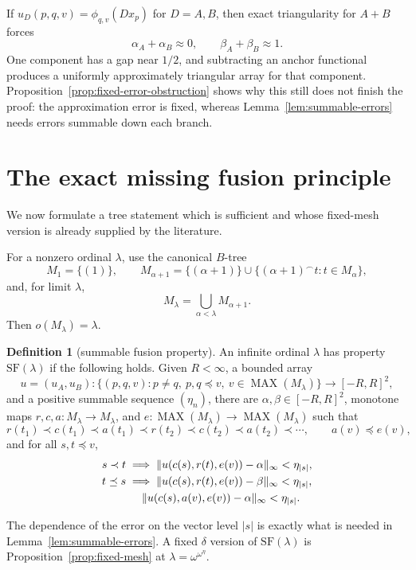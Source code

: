 \documentclass[11pt]{article}
\theoremstyle{definition}
\newtheorem{definition}[theorem]{Definition}
\theoremstyle{remark}
\newcommand{\MAX}{\operatorname{MAX}}
\begin{document}
If $u_D(p,q,v)=\phi_{q,v}(D x_p)$ for $D=A,B$, then exact triangularity for $A+B$ forces
\[
   \alpha_A+\alpha_B\approx0,
   \qquad
   \beta_A+\beta_B\approx1.
\]
One component has a gap near $1/2$, and subtracting an anchor functional produces a uniformly approximately triangular array for that component.  Proposition~\ref{prop:fixed-error-obstruction} shows why this still does not finish the proof: the approximation error is fixed, whereas Lemma~\ref{lem:summable-errors} needs errors summable down each branch.

\section{The exact missing fusion principle}

We now formulate a tree statement which is sufficient and whose fixed-mesh version is already supplied by the literature.

For a nonzero ordinal $\lambda$, use the canonical $B$-tree
\[
 M_1=\{(1)\},\qquad
 M_{\alpha+1}=\{(\alpha+1)\}\cup\{(\alpha+1)^\frown t:t\in M_\alpha\},
\]
and, for limit $\lambda$,
\[
 M_\lambda=\bigcup_{\alpha<\lambda}M_{\alpha+1}.
\]
Then $o(M_\lambda)=\lambda$.

\begin{definition}[summable fusion property]\label{def:SF}
An infinite ordinal $\lambda$ has property $\mathrm{SF}(\lambda)$ if the following holds.  Given $R<\infty$, a bounded array
\[
  u=(u_A,u_B):
  \{(p,q,v):p\neq q,\ p,q\preceq v,\ v\in\MAX(M_\lambda)\}
  \longrightarrow[-R,R]^2,
\]
and a positive summable sequence $(\eta_n)$, there are $\alpha,\beta\in[-R,R]^2$, monotone maps $r,c,a:M_\lambda\to M_\lambda$, and $e:\MAX(M_\lambda)\to\MAX(M_\lambda)$ such that
\[
 r(t_1)\prec c(t_1)\prec a(t_1)\prec r(t_2)\prec c(t_2)\prec a(t_2)\prec\cdots,
 \qquad a(v)\preceq e(v),
\]
and for all $s,t\preceq v$,
\begin{align}
 s\prec t&\implies
 \|u(c(s),r(t),e(v))-\alpha\|_\infty<\eta_{|s|},\label{eq:SF-pre}\\
 t\preceq s&\implies
 \|u(c(s),r(t),e(v))-\beta\|_\infty<\eta_{|s|},\label{eq:SF-post}\\
 &\hspace{5mm}
 \|u(c(s),a(v),e(v))-\alpha\|_\infty<\eta_{|s|}.
 \label{eq:SF-anchor}
\end{align}
\end{definition}

The dependence of the error on the vector level $|s|$ is exactly what is needed in Lemma~\ref{lem:summable-errors}.  A fixed $\delta$ version of $\mathrm{SF}(\lambda)$ is Proposition~\ref{prop:fixed-mesh} at $\lambda=\omega^{\omega^\eta}$.
\end{document}
